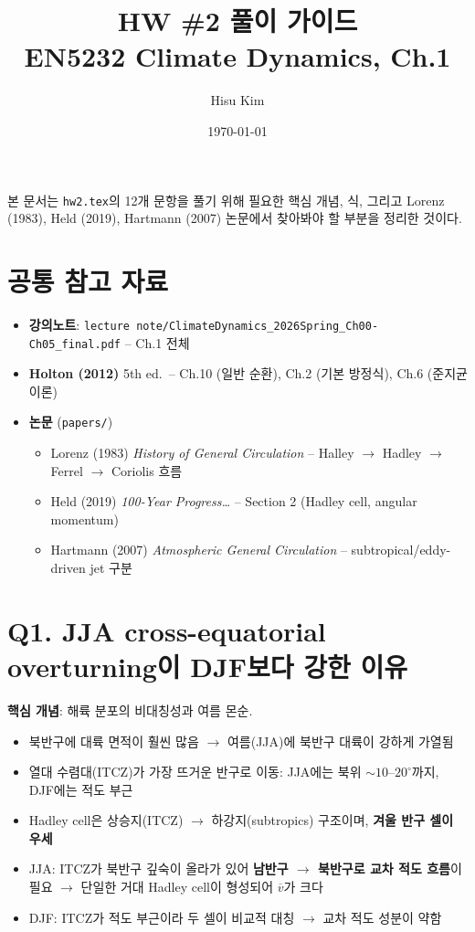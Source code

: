 \documentclass[11pt,a4paper]{article}
\title{HW \#2 풀이 가이드\\[-0.2em] \large EN5232 Climate Dynamics, Ch.1}
\author{Hisu Kim}
\date{\today}
\begin{document}
\maketitle

\noindent 본 문서는 \texttt{hw2.tex}의 12개 문항을 풀기 위해 필요한 핵심 개념, 식, 그리고 Lorenz (1983), Held (2019), Hartmann (2007) 논문에서 찾아봐야 할 부분을 정리한 것이다.

\section*{공통 참고 자료}
\begin{itemize}
    \item \textbf{강의노트}: \texttt{lecture note/ClimateDynamics\_2026Spring\_Ch00-Ch05\_final.pdf} -- Ch.1 전체
    \item \textbf{Holton (2012)} 5th ed.\ -- Ch.10 (일반 순환), Ch.2 (기본 방정식), Ch.6 (준지균 이론)
    \item \textbf{논문} (\texttt{papers/})
    \begin{itemize}
        \item Lorenz (1983) \textit{History of General Circulation} -- Halley $\to$ Hadley $\to$ Ferrel $\to$ Coriolis 흐름
        \item Held (2019) \textit{100-Year Progress\ldots} -- Section 2 (Hadley cell, angular momentum)
        \item Hartmann (2007) \textit{Atmospheric General Circulation} -- subtropical/eddy-driven jet 구분
    \end{itemize}
\end{itemize}

\section*{Q1. JJA cross-equatorial overturning이 DJF보다 강한 이유}

\textbf{핵심 개념}: 해륙 분포의 비대칭성과 여름 몬순.
\begin{itemize}
    \item 북반구에 대륙 면적이 훨씬 많음 $\to$ 여름(JJA)에 북반구 대륙이 강하게 가열됨
    \item 열대 수렴대(ITCZ)가 가장 뜨거운 반구로 이동: JJA에는 북위 $\sim 10$--$20^\circ$까지, DJF에는 적도 부근
    \item Hadley cell은 상승지(ITCZ) $\to$ 하강지(subtropics) 구조이며, \textbf{겨울 반구 셀이 우세}
    \item JJA: ITCZ가 북반구 깊숙이 올라가 있어 \textbf{남반구 $\to$ 북반구로 교차 적도 흐름}이 필요 $\to$ 단일한 거대 Hadley cell이 형성되어 $\overline{v}$가 크다
    \item DJF: ITCZ가 적도 부근이라 두 셀이 비교적 대칭 $\to$ 교차 적도 성분이 약함
\end{itemize}
\end{document}
